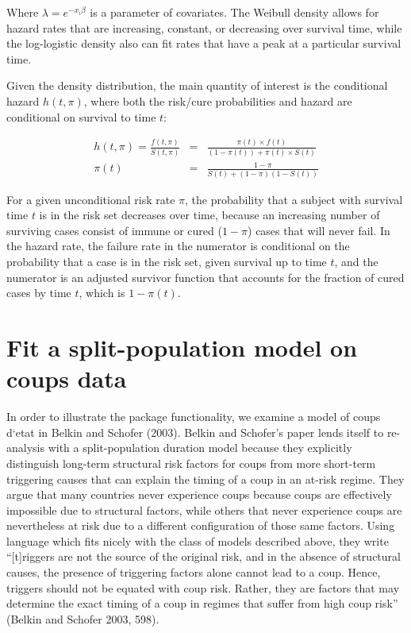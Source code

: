 \documentclass[article]{jss}
\begin{document}
Where \(\lambda = e^{-x_i\beta}\) is a parameter of covariates. The
Weibull density allows for hazard rates that are increasing, constant,
or decreasing over survival time, while the log-logistic density also
can fit rates that have a peak at a particular survival time.

Given the density distribution, the main quantity of interest is the
conditional hazard \(h(t, \pi)\), where both the risk/cure probabilities
and hazard are conditional on survival to time \(t\):

\begin{eqnarray}
h(t, \pi) = \frac{f(t, \pi)}{S(t, \pi)} & = & \frac{ \pi(t) \times f(t) }{ (1-\pi(t)) + \pi(t) \times S(t) } \\
 \pi(t) & = & \frac{ 1-\pi }{ S(t) + (1-\pi) (1 - S(t)) }
\end{eqnarray}

For a given unconditional risk rate \(\pi\), the probability that a
subject with survival time \(t\) is in the risk set decreases over time,
because an increasing number of surviving cases consist of immune or
cured (\(1-\pi\)) cases that will never fail. In the hazard rate, the
failure rate in the numerator is conditional on the probability that a
case is in the risk set, given survival up to time \(t\), and the
numerator is an adjusted survivor function that accounts for the
fraction of cured cases by time \(t\), which is \(1-\pi(t)\).

\section{Fit a split-population model on coups
data}\label{fit-a-split-population-model-on-coups-data}

In order to illustrate the package functionality, we examine a model of
coups d`etat in Belkin and Schofer (2003). Belkin and Schofer's paper
lends itself to re-analysis with a split-population duration model
because they explicitly distinguish long-term structural risk factors
for coups from more short-term triggering causes that can explain the
timing of a coup in an at-risk regime. They argue that many countries
never experience coups because coups are effectively impossible due to
structural factors, while others that never experience coups are
nevertheless at risk due to a different configuration of those same
factors. Using language which fits nicely with the class of models
described above, they write ``{[}t{]}riggers are not the source of the
original risk, and in the absence of structural causes, the presence of
triggering factors alone cannot lead to a coup. Hence, triggers should
not be equated with coup risk. Rather, they are factors that may
determine the exact timing of a coup in regimes that suffer from high
coup risk'' (Belkin and Schofer 2003, 598).
\end{document}
